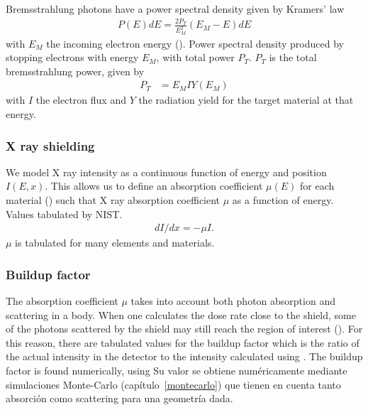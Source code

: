 Bremsstrahlung photons have a power spectral density given by
Kramers' law\cite{kramers_xciii._1923}
\begin{align}
    P(E)dE = \frac{2P_T}{E_M^2}(E_M-E)dE
    \label{eq:kramers}
\end{align} with $E_M$ the incoming electron energy ().
{Power spectral density produced by stopping electrons with energy $E_M$,
with total power $P_T$.}
$P_T$ is the total bremsstrahlung power, given by
\begin{align*}
    P_T&=E_MIY(E_M)
\end{align*} with $I$ the electron flux
and $Y$ the radiation yield for the target material at that energy.
\subsubsection{X ray shielding}
We model X ray intensity as a continuous function of energy and position $I(E,x)$.
This allows us to define an absorption coefficient $\mu(E)$ for each material
() such that
{X ray absorption coefficient $\mu$ as a function of energy.
    Values tabulated by NIST\cite{xraycoef}.}
\begin{align}
    \label{eq:absorcionx}
    dI/dx=-\mu I.
\end{align}
$\mu$ is tabulated for many elements and materials\cite{xraycoef}.
\subsubsection{Buildup factor}
The absorption coefficient $\mu$ takes into account both photon absorption and scattering in a body.
When one calculates the dose rate close to the shield,
some of the photons scattered by the shield may still reach the region of interest
().
For this reason, there are tabulated values for the buildup factor
which is the ratio of the actual intensity in the detector
to the intensity calculated using .
The buildup factor is found numerically, using 
Su valor se obtiene numéricamente mediante simulaciones Monte-Carlo
(capítulo~\ref{montecarlo})
que tienen en cuenta tanto absorción como scattering
para una geometría dada.
